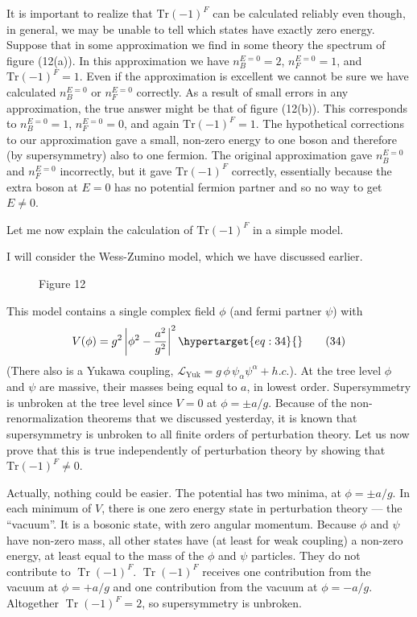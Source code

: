 \documentclass[11pt,a4paper]{article}
\newcommand{\eqtarget}[1]{\hypertarget{eq:#1}{\mathstrut}\tag{#1}}
\begin{document}
It is important to realize that $\mathrm{Tr}(-1)^F$ can be calculated
reliably even though, in general, we may be unable to tell which
states have exactly zero energy. Suppose that in some approximation
we find in some theory the spectrum of figure (12(a)). In this approximation
we have $n_B^{E=0} = 2$, $n_F^{E=0} = 1$, and $\mathrm{Tr}(-1)^F = 1$. Even if
the approximation is excellent we cannot be sure we have calculated
$n_B^{E=0}$ or $n_F^{E=0}$ correctly. As a result of small errors in any approximation,
the true answer might be that of figure (12(b)). This corresponds
to $n_B^{E=0} = 1$, $n_F^{E=0} = 0$, and again $\mathrm{Tr}(-1)^F = 1$. The hypothetical
corrections to our approximation gave a small, non-zero
energy to one boson and therefore (by supersymmetry) also to one
fermion. The original approximation gave $n_B^{E=0}$ and $n_F^{E=0}$ incorrectly,
but it gave $\mathrm{Tr}(-1)^F$ correctly, essentially because the extra boson at
$E = 0$ has no potential fermion partner and so no way to get $E \neq 0$.

Let me now explain the calculation of $\mathrm{Tr}(-1)^F$ in a simple model.

I will consider the Wess-Zumino model, which we have discussed
earlier.

\begin{figure}[h]
\centering

\par\smallskip
Figure 12
\end{figure}

This model contains a single complex field $\phi$ (and fermi
partner $\psi$) with
\begin{equation}
V(\phi) = g^2 \left|\phi^2 - \frac{a^2}{g^2}\right|^2
\eqtarget{34}
\end{equation}
(There also is a Yukawa coupling, $\mathcal{L}_{\mathrm{Yuk}} = g\, \phi\, \psi_\alpha \psi^\alpha + h.c.$). At the
tree level $\phi$ and $\psi$ are massive, their masses being equal to $a$, in
lowest order. Supersymmetry is unbroken at the tree level since
$V = 0$ at $\phi = \pm a/g$. Because of the non-renormalization theorems that
we discussed yesterday, it is known that supersymmetry is unbroken
to all finite orders of perturbation theory. Let us now prove that
this is true independently of perturbation theory by showing that
$\mathrm{Tr}(-1)^F \neq 0$.

Actually, nothing could be easier. The potential has two minima,
at $\phi = \pm a/g$. In each minimum of $V$, there is one zero energy state in
perturbation theory --- the ``vacuum''. It is a bosonic state, with
zero angular momentum. Because $\phi$ and $\psi$ have non-zero mass, all
other states have (at least for weak coupling) a non-zero energy,
at least equal to the mass of the $\phi$ and $\psi$ particles. They do not
contribute to $\operatorname{Tr}(-1)^F$. $\operatorname{Tr}(-1)^F$ receives one contribution from the
vacuum at $\phi = +a/g$ and one contribution from the vacuum at $\phi = -a/g$.
Altogether $\operatorname{Tr}(-1)^F = 2$, so supersymmetry is unbroken.
\end{document}
